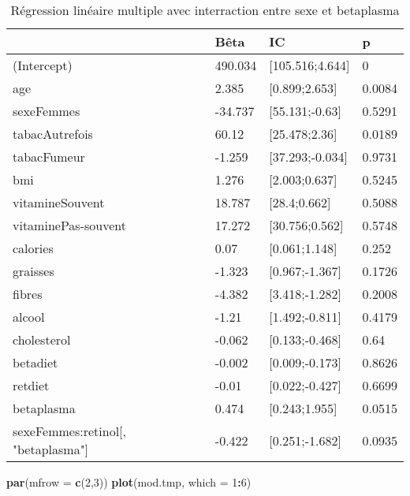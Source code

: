 \documentclass[]{article}
\newenvironment{Shaded}{\begin{snugshade}}{\end{snugshade}}
\newcommand{\KeywordTok}[1]{\textcolor[rgb]{0.13,0.29,0.53}{\textbf{#1}}}
\newcommand{\DataTypeTok}[1]{\textcolor[rgb]{0.13,0.29,0.53}{#1}}
\newcommand{\DecValTok}[1]{\textcolor[rgb]{0.00,0.00,0.81}{#1}}
\newcommand{\OperatorTok}[1]{\textcolor[rgb]{0.81,0.36,0.00}{\textbf{#1}}}
\newcommand{\NormalTok}[1]{#1}
\begin{document}
\begin{table}

\caption{\label{tab:unnamed-chunk-70}Régression linéaire multiple avec interraction entre sexe et betaplasma}
\centering
\begin{tabular}[t]{l|l|l|l}
\hline
  & Bêta & IC & p\\
\hline
\rowcolor[HTML]{BBD2E1}  (Intercept) & 490.034 & [105.516;4.644] & 0\\
\hline
age & 2.385 & [0.899;2.653] & 0.0084\\
\hline
\rowcolor[HTML]{BBD2E1}  sexeFemmes & -34.737 & [55.131;-0.63] & 0.5291\\
\hline
tabacAutrefois & 60.12 & [25.478;2.36] & 0.0189\\
\hline
\rowcolor[HTML]{BBD2E1}  tabacFumeur & -1.259 & [37.293;-0.034] & 0.9731\\
\hline
bmi & 1.276 & [2.003;0.637] & 0.5245\\
\hline
\rowcolor[HTML]{BBD2E1}  vitamineSouvent & 18.787 & [28.4;0.662] & 0.5088\\
\hline
vitaminePas-souvent & 17.272 & [30.756;0.562] & 0.5748\\
\hline
\rowcolor[HTML]{BBD2E1}  calories & 0.07 & [0.061;1.148] & 0.252\\
\hline
graisses & -1.323 & [0.967;-1.367] & 0.1726\\
\hline
\rowcolor[HTML]{BBD2E1}  fibres & -4.382 & [3.418;-1.282] & 0.2008\\
\hline
alcool & -1.21 & [1.492;-0.811] & 0.4179\\
\hline
\rowcolor[HTML]{BBD2E1}  cholesterol & -0.062 & [0.133;-0.468] & 0.64\\
\hline
betadiet & -0.002 & [0.009;-0.173] & 0.8626\\
\hline
\rowcolor[HTML]{BBD2E1}  retdiet & -0.01 & [0.022;-0.427] & 0.6699\\
\hline
betaplasma & 0.474 & [0.243;1.955] & 0.0515\\
\hline
\rowcolor[HTML]{BBD2E1}  sexeFemmes:retinol[, "betaplasma"] & -0.422 & [0.251;-1.682] & 0.0935\\
\hline
\end{tabular}
\end{table}

\begin{Shaded}
\begin{Highlighting}[]
\KeywordTok{par}\NormalTok{(}\DataTypeTok{mfrow =} \KeywordTok{c}\NormalTok{(}\DecValTok{2}\NormalTok{,}\DecValTok{3}\NormalTok{))}
\KeywordTok{plot}\NormalTok{(mod.tmp, }\DataTypeTok{which =} \DecValTok{1}\OperatorTok{:}\DecValTok{6}\NormalTok{)}
\end{Highlighting}
\end{Shaded}
\end{document}
